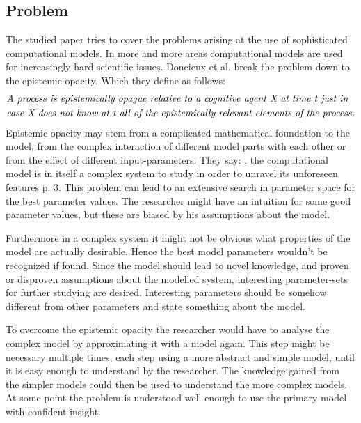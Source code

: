 \documentclass[12pt,twoside]{article}
\theoremstyle{plain}
\theoremstyle{definition}
\theoremstyle{remark}
\begin{document}
\subsection{Problem}
The studied paper \cite{doncieux2015multi} tries to cover the problems arising at the use of sophisticated computational models.
In more and more areas computational models are used for increasingly hard scientific issues.
Doncieux et al. break the problem down to the epistemic opacity. Which they define as follows:
\begin{align*}
	&\text{\textit{A process is epistemically opague relative to a cognitive agent X at time t just in}}\\
	&\text{\textit{case X does not know at t all of the epistemically relevant elements of the process.}}
\end{align*}
Epistemic opacity may stem from a complicated mathematical foundation to the model, from the complex interaction of different model parts with each other or from the effect of different input-parameters.
They say: \glqq[...], the computational model is in itself a complex system to study in order to unravel its unforeseen features\grqq{} \cite{doncieux2015multi} p. 3.
This problem can lead to an extensive search in parameter space for the \glqq best\grqq{} parameter values.
The researcher might have an intuition for some good parameter values, but these are biased by his assumptions about the model. 

Furthermore in a complex system it might not be obvious what properties of the model are actually desirable. Hence the \glqq best\grqq{} model parameters wouldn't be recognized if found.
Since the model should lead to novel knowledge, and proven or disproven assumptions about the modelled system, interesting parameter-sets for further studying are desired. Interesting parameters should be somehow different from other parameters and state something about the model.

To overcome the epistemic opacity the researcher would have to analyse the complex model by approximating it with a model again. This step might be necessary multiple times, each step using a more abstract and simple model, until it is easy enough to understand by the researcher. The knowledge gained from the simpler models could then be used to understand the more complex models. At some point the problem is understood well enough to use the primary model with confident insight.
\end{document}
